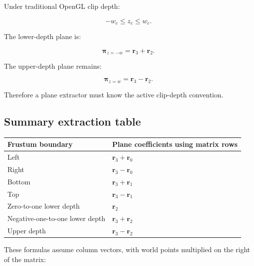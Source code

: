 \hypertarget{02-foundations-ii-ch034-opengl-style-negative-one-to-one-depth}{}

Under traditional OpenGL clip depth:

\[
 -w_c\le z_c\le w_c.
\]

The lower-depth plane is:

\[
 \boxed{ \boldsymbol\pi_{z=-w}=\mathbf r_3+\mathbf r_2 }.
\]

The upper-depth plane remains:

\[
 \boxed{ \boldsymbol\pi_{z=w}=\mathbf r_3-\mathbf r_2 }.
\]

Therefore a plane extractor must know the active clip-depth convention.

\subsection{Summary extraction table}\label{02-foundations-ii-ch034-summary-extraction-table}

\hypertarget{02-foundations-ii-ch034-summary-extraction-table}{}

{\def\LTcaptype{none} %
\begin{longtable}[]{@{}
  >{\raggedright\arraybackslash}p{}
  >{\raggedright\arraybackslash}p{}@{}}
\toprule\noalign{}
\begin{minipage}[b]{\linewidth}\raggedright
Frustum boundary
\end{minipage} & \begin{minipage}[b]{\linewidth}\raggedright
Plane coefficients using matrix rows
\end{minipage} \\
\midrule\noalign{}
\endhead
\bottomrule\noalign{}
\endlastfoot
Left & \(\mathbf r_3+\mathbf r_0\) \\
Right & \(\mathbf r_3-\mathbf r_0\) \\
Bottom & \(\mathbf r_3+\mathbf r_1\) \\
Top & \(\mathbf r_3-\mathbf r_1\) \\
Zero-to-one lower depth & \(\mathbf r_2\) \\
Negative-one-to-one lower depth & \(\mathbf r_3+\mathbf r_2\) \\
Upper depth & \(\mathbf r_3-\mathbf r_2\) \\
\end{longtable}
}

These formulas assume column vectors, with world points multiplied on the right of the matrix:

